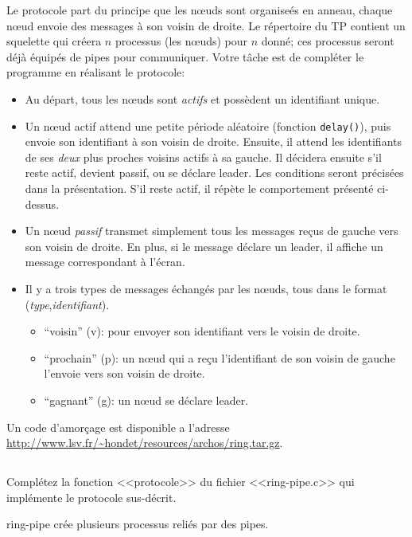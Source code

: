 \documentclass{exam}
\begin{document}
\begin{questions}
Le protocole part du principe que les nœuds sont organiseés en anneau,
chaque nœud envoie des messages à son voisin de droite.  Le répertoire
du TP contient un squelette qui créera $n$ processus (les nœuds) pour
$n$ donné; ces processus seront déjà équipés de pipes pour
communiquer. Votre tâche est de compléter le programme en réalisant le
protocole:

\begin{itemize}
\item Au départ, tous les nœuds sont \emph{actifs} et possèdent un
  identifiant unique.

\item Un nœud actif attend une petite période aléatoire (fonction
  \texttt{delay()}), puis envoie son identifiant à son voisin de
  droite. Ensuite, il attend les identifiants de ses \emph{deux} plus
  proches voisins actifs à sa gauche.  Il décidera ensuite s'il reste
  actif, devient passif, ou se déclare leader. Les conditions seront
  précisées dans la présentation. S'il reste actif, il répète le
  comportement présenté ci-dessus.

\item Un nœud \emph{passif} transmet simplement tous les messages
  reçus de gauche vers son voisin de droite. En plus, si le message
  déclare un leader, il affiche un message correspondant à l'écran.

\item Il y a trois types de messages échangés par les nœuds, tous dans
  le format (\emph{type},\emph{identifiant}).

  \begin{itemize}
  \item ``voisin'' (v): pour envoyer son identifiant vers le voisin de
    droite.
  \item ``prochain'' (p): un nœud qui a reçu l'identifiant de son
    voisin de gauche l'envoie vers son voisin de droite.
  \item ``gagnant'' (g): un nœud se déclare leader.
  \end{itemize}
\end{itemize}

Un code d'amorçage est disponible a l'adresse
\url{http://www.lsv.fr/~hondet/resources/archos/ring.tar.gz}.

\begin{parts}
  \part{} Complétez la fonction <<protocole>> du fichier
  <<ring-pipe.c>> qui implémente le protocole sus-décrit.
  \begin{solution}
    ring-pipe crée plusieurs processus reliés par des pipes.
    \inputminted{C}{correc/ring/ring-pipe.c}
  \end{solution}

\end{parts}
\end{questions}
\end{document}
